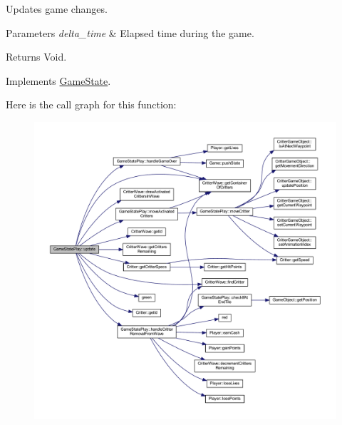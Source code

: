 Updates game changes. 


\begin{DoxyParams}{Parameters}
{\em delta\+\_\+time} & Elapsed time during the game. \\
\hline
\end{DoxyParams}
\begin{DoxyReturn}{Returns}
Void. 
\end{DoxyReturn}


Implements \hyperlink{class_game_state_ad331d02d3989271b8cbc88fcb1448959}{Game\+State}.



Here is the call graph for this function\+:\nopagebreak
\begin{figure}[H]
\begin{center}
\leavevmode
\includegraphics[width=350pt]{class_game_state_play_a2faf041a447ddf86726658455560abb8_cgraph}
\end{center}
\end{figure}




